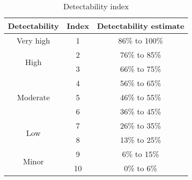 \begin{table}[!htb]
    \centering
        \begin{tabular}{ ccc }
        \hline
        Detectability & Index & Detectability estimate \\ \hline\hline
        Very high                   & 1  & 86\% to 100\% \\
        \multirow{2}{*}{High}       & 2  & 76\% to 85\% \\
                                    & 3  & 66\% to 75\% \\
        \multirow{3}{*}{Moderate}   & 4  & 56\% to 65\% \\
                                    & 5  & 46\% to 55\%\\
                                    & 6  & 36\% to 45\% \\
        \multirow{2}{*}{Low}        & 7  & 26\% to 35\% \\
                                    & 8  & 13\% to 25\%\\
        \multirow{2}{*}{Minor}      & 9  & 6\% to 15\% \\
                                    & 10 & 0\% to 6\% \\
                                     
        \end{tabular}
        \caption{Detectability index}\label{tab:detectability}
\end{table}



